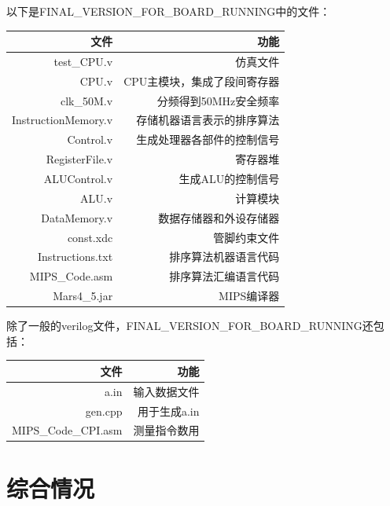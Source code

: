 \documentclass[10pt]{article}
\begin{document}
以下是FINAL\_VERSION\_FOR\_BOARD\_RUNNING中的文件：
\begin{table}[h]
    \footnotesize
\begin{center}
    \begin{tabular}{|r|r|}
        \hline
        文件&功能\\
        \hline
        test\_CPU.v&仿真文件\\
        \hline
        CPU.v&CPU主模块，集成了段间寄存器\\
        \hline
        clk\_50M.v&分频得到50MHz安全频率\\
        \hline
        InstructionMemory.v&存储机器语言表示的排序算法\\
        \hline
        Control.v&生成处理器各部件的控制信号\\
        \hline
        RegisterFile.v&寄存器堆\\
        \hline
        ALUControl.v&生成ALU的控制信号\\
        \hline
        ALU.v&计算模块\\
        \hline
        DataMemory.v&数据存储器和外设存储器\\
        \hline
        const.xdc& 管脚约束文件\\
        \hline
        Instructions.txt& 排序算法机器语言代码\\
        \hline
        MIPS\_Code.asm& 排序算法汇编语言代码\\
        \hline
        Mars4\_5.jar& MIPS编译器\\
        \hline
    \end{tabular}
\end{center}
\end{table}

除了一般的verilog文件，FINAL\_VERSION\_FOR\_BOARD\_RUNNING还包括：
\begin{table}[h]
    \footnotesize
\begin{center}
    \begin{tabular}{|r|r|}
        \hline
        文件&功能\\
        \hline
        a.in&输入数据文件\\
        \hline
        gen.cpp&用于生成a.in\\
        \hline
        MIPS\_Code\_CPI.asm&测量指令数用\\
        \hline
    \end{tabular}
\end{center}
\end{table}
\section{综合情况}
\end{document}
